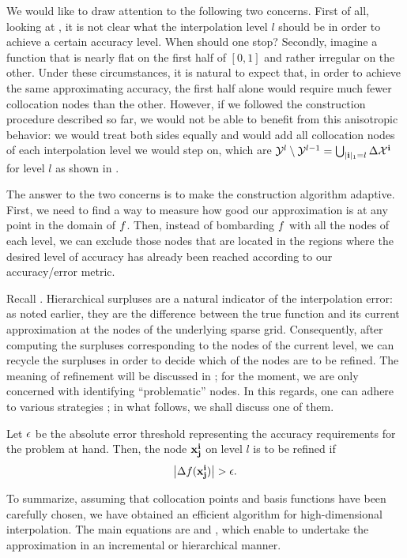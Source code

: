 We would like to draw attention to the following two concerns. First of all,
looking at , it is not clear what the interpolation
level $l$ should be in order to achieve a certain accuracy level. When should
one stop? Secondly, imagine a function that is nearly flat on the first half of
$[0, 1]$ and rather irregular on the other. Under these circumstances, it is
natural to expect that, in order to achieve the same approximating accuracy, the
first half alone would require much fewer collocation nodes than the other.
However, if we followed the construction procedure described so far, we would
not be able to benefit from this anisotropic behavior: we would treat both sides
equally and would add all collocation nodes of each interpolation level we would
step on, which are $\mathcal{Y}^l \setminus \mathcal{Y}^{l - 1} = \bigcup_{|\mathbf{i}|_1 = l}
\Delta\mathcal{X}^{\mathbf{i}}$ for level $l$ as shown in .

The answer to the two concerns is to make the construction algorithm adaptive.
First, we need to find a way to measure how good our approximation is at any
point in the domain of $f$. Then, instead of bombarding $f$ with all the nodes
of each level, we can exclude those nodes that are located in the regions where
the desired level of accuracy has already been reached according to our
accuracy/error metric.

Recall . Hierarchical surpluses are a natural indicator
of the interpolation error: as noted earlier, they are the difference between
the true function and its current approximation at the nodes of the underlying
sparse grid. Consequently, after computing the surpluses corresponding to the
nodes of the current level, we can recycle the surpluses in order to decide
which of the nodes are to be refined. The meaning of refinement will be
discussed in ; for the moment, we are only concerned
with identifying ``problematic'' nodes. In this regards, one can adhere to
various strategies \cite{ma2009}; in what follows, we shall discuss one of them.

Let $\epsilon$ be the absolute error threshold representing the accuracy
requirements for the problem at hand. Then, the node $\mathbf{x}^{\mathbf{i}}_{\mathbf{j}}$ on level $l$
is to be refined if
\begin{equation} \elab{error}
  \left| \surplus(\vx^\vi_\vj) \right| > \error.
\end{equation}

To summarize, assuming that collocation points and basis functions have been
carefully chosen, we have obtained an efficient algorithm for high-dimensional
interpolation. The main equations are  and
, which enable to undertake the approximation in an
incremental or hierarchical manner.
